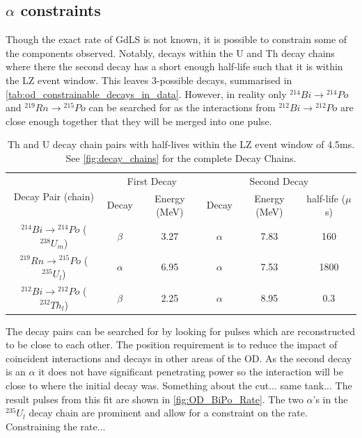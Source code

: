 

\subsection{$\alpha$ constraints}
\par
Though the exact rate of GdLS is not known, it is possible to constrain some of the components observed.
Notably, decays within the U and Th decay chains where there the second decay has a short enough half-life such that it is within the LZ event window.
This leaves 3-possible decays, summarised in \autoref{tab:od_constrainable_decays_in_data}.
However, in reality only  ${}^{214}Bi \to {}^{214}Po$ and ${}^{219}Rn \to {}^{215}Po$ can be searched for as the interactions from ${}^{212}Bi \to {}^{212}Po$ are close enough together that they will be merged into one pulse.

\begin{table}[!htbp]
    \centering
    \begin{tabular}{c|c|c|c|c|c}
        \multirow{2}{*}{Decay Pair (chain)}                    & \multicolumn{2}{c|}{First Decay}   & \multicolumn{3}{c}{Second Decay}    \\ 
                                                               & Decay    & Energy (MeV) & Decay    & Energy (MeV) & half-life ($\mu$s) \\ \hline
        ${}^{214}Bi \to {}^{214}Po$ (${}^{238}U_{m}$)          & $\beta$  & 3.27         & $\alpha$ & 7.83         & 160   \\ 
        ${}^{219}Rn \to {}^{215}Po$ (${}^{235}U_{l}$)          & $\alpha$ & 6.95         & $\alpha$ & 7.53         & 1800  \\ 
        ${}^{212}Bi \to {}^{212}Po$ (${}^{232}Th_{l}$)         & $\beta$  & 2.25         & $\alpha$ & 8.95         & 0.3
    \end{tabular}
    \caption{Th and U decay chain pairs with half-lives within the LZ event window of 4.5ms. See \autoref{fig:decay_chains} for the complete Decay Chains.}
    \label{tab:od_constrainable_decays_in_data}
\end{table}

\par
The decay pairs can be searched for by looking for pulses which are reconstructed to be close to each other.
The position requirement is to reduce the impact of coincident interactions and decays in other areas of the OD.
As the second decay is an $\alpha$ it does not have significant penetrating power so the interaction will be close to where the initial decay was.
Something about the cut... same tank...
The result pulses from this fit are shown in \autoref{fig:OD_BiPo_Rate}.
The two $\alpha$'s in the ${}^{235}U_{l}$ decay chain are prominent and allow for a constraint on the rate.
Constraining the rate...

